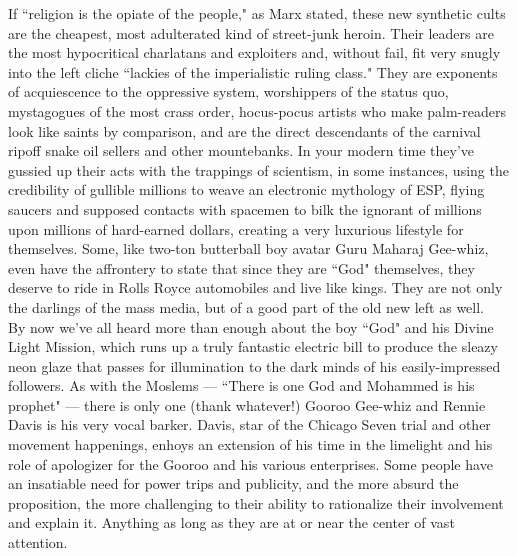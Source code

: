 If ``religion is the opiate of the people," as Marx stated, these new synthetic cults are the cheapest, most adulterated kind of street-junk heroin. Their leaders are the most hypocritical charlatans and exploiters and, without fail, fit very snugly into the left cliche ``lackies of the imperialistic ruling class." They are exponents of acquiescence to the oppressive system, worshippers of the status quo, mystagogues of the most crass order, hocus-pocus artists who make palm-readers look like saints by comparison, and are the direct descendants of the carnival ripoff snake oil sellers and other mountebanks. In your modern time they've gussied up their acts with the trappings of scientism, in some instances, using the credibility of gullible millions to weave an electronic mythology of ESP, flying saucers and supposed contacts with spacemen to bilk the ignorant of millions upon millions of hard-earned dollars, creating a very luxurious lifestyle for themselves. Some, like two-ton butterball boy avatar Guru Maharaj Gee-whiz, even have the affrontery to state that since they are ``God" themselves, they deserve to ride in Rolls Royce automobiles and live like kings. They are not only the darlings of the mass media, but of a good part of the old new left as well.\\
By now we've all heard more than enough about the boy ``God" and his Divine Light Mission, which runs up a truly fantastic electric bill to produce the sleazy neon glaze that passes for illumination to the dark minds of his easily-impressed followers. As with the Moslems --- ``There is one God and Mohammed is his prophet" --- there is only one (thank whatever!) Gooroo Gee-whiz and Rennie Davis is his very vocal barker. Davis, star of the Chicago Seven trial and other movement happenings, enhoys an extension of his time in the limelight and his role of apologizer for the Gooroo and his various enterprises. Some people have an insatiable need for power trips and publicity, and the more absurd the proposition, the more challenging to their ability to rationalize their involvement and explain it. Anything as long as they are at or near the center of vast attention.\\

